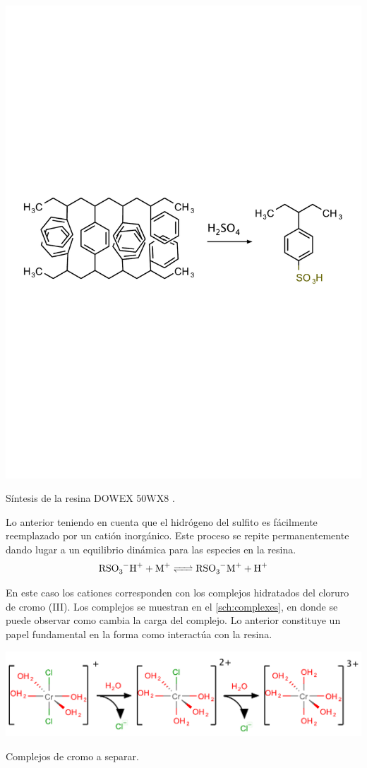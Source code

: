 \documentclass[fleqn,10pt]{SelfArx} %
\begin{document}
\begin{scheme}[h]
	    \includegraphics[width=\linewidth]{images/Resina2.pdf}
	    \caption{S\'intesis de la resina DOWEX 50WX8 \cite{DOWEX}.}
	    \label{sch:DOWEX}
	\end{scheme}
	
	Lo anterior teniendo en cuenta que el hidr\'ogeno del sulfito es f\'acilmente reemplazado por un cati\'on inorg\'anico. Este proceso se repite permanentemente dando lugar a un equilibrio din\'amica para las especies en la resina.
	\begin{equation}
	\ce{RSO3^-H+ + M+ <=> RSO3^-M+ + H+}
	\end{equation}
	
	En este caso los cationes corresponden con los complejos hidratados del cloruro de cromo (III). Los complejos se muestran en el \autoref{sch:complexes}, en donde se puede observar como cambia la carga del complejo. Lo anterior constituye un papel fundamental en la forma como interact\'ua con la resina.
	\begin{scheme}[h]
	    \centering
	    \includegraphics[width=\linewidth]{images/Complex.pdf}
	    \caption{Complejos de cromo a separar.}
	    \label{sch:complexes}
	\end{scheme}
	
\end{document}
